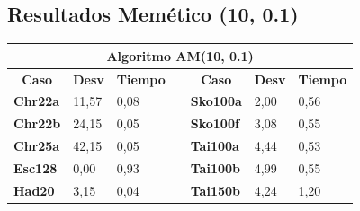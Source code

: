 \documentclass[a4paper, 12pt]{article}
\begin{document}
      \subsection{Resultados Memético (10, 0.1)}
      \begin{table}[H]
\centering
\label{my-label}
\begin{tabular}{|l|l|l|l|l|l|l|}
\hline
\multicolumn{7}{|c|}{\textbf{Algoritmo AM(10, 0.1)}}                                                                                                                                                                                                              \\ \hline
\multicolumn{1}{|c|}{\textbf{Caso}} & \multicolumn{1}{c|}{\textbf{Desv}} & \multicolumn{1}{c|}{\textbf{Tiempo}} & \multicolumn{1}{c|}{\textbf{}} & \multicolumn{1}{c|}{\textbf{Caso}} & \multicolumn{1}{c|}{\textbf{Desv}} & \multicolumn{1}{c|}{\textbf{Tiempo}} \\ \cline{1-3} \cline{5-7} 
\textbf{Chr22a}                     & 11,57                              & 0,08                                 &                                & \textbf{Sko100a}                   & 2,00                               & 0,56                                 \\ \cline{1-3} \cline{5-7} 
\textbf{Chr22b}                     & 24,15                              & 0,05                                 &                                & \textbf{Sko100f}                   & 3,08                               & 0,55                                 \\ \cline{1-3} \cline{5-7} 
\textbf{Chr25a}                     & 42,15                              & 0,05                                 &                                & \textbf{Tai100a}                   & 4,44                               & 0,53                                 \\ \cline{1-3} \cline{5-7} 
\textbf{Esc128}                     & 0,00                               & 0,93                                 &                                & \textbf{Tai100b}                   & 4,99                               & 0,55                                 \\ \cline{1-3} \cline{5-7} 
\textbf{Had20}                      & 3,15                               & 0,04                                 &                                & \textbf{Tai150b}                   & 4,24                               & 1,20                                 \\ \cline{1-3} \cline{5-7} 

\end{tabular}
\end{table}
\end{document}
